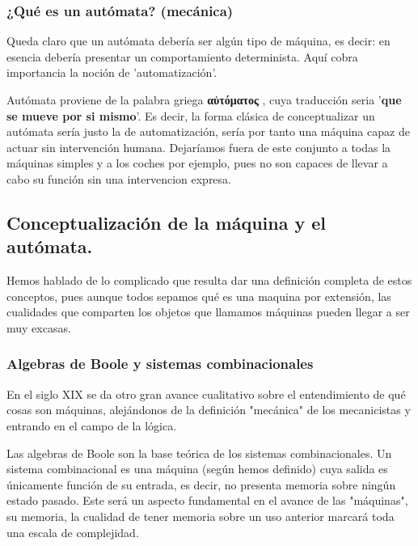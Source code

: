 \subsubsection{ ¿Qué es un autómata? (mecánica)}

Queda claro que un autómata debería ser algún tipo de máquina, es decir: en esencia debería presentar un comportamiento determinista. Aquí cobra importancia la noción de 'automatización'.

\vspace{10px}

Autómata proviene de la palabra griega \textbf{\textgreek{αὐτόματος}} , cuya traducción seria '\textbf{que se mueve por si mismo}'. Es decir, la forma clásica de conceptualizar un autómata sería justo la de automatización, sería por tanto una máquina capaz de actuar sin intervención humana. Dejaríamos fuera de este conjunto a todas la máquinas simples y a los coches por ejemplo, pues no son capaces de llevar a cabo su función sin una intervencion expresa.




\subsection{ Conceptualización de la máquina y el autómata.}

Hemos hablado de lo complicado que resulta dar una definición completa de estos conceptos, pues aunque todos sepamos qué es una maquina por extensión, las cualidades que comparten los objetos que llamamos máquinas pueden llegar a ser muy excasas.

\subsubsection{ Algebras de Boole y sistemas combinacionales}

En el siglo XIX se da otro gran avance cualitativo sobre el entendimiento de qué cosas son máquinas, alejándonos de la definición "mecánica" de los mecanicistas y entrando en el campo de la lógica.

\vspace{10px}

Las algebras de Boole son la base teórica de los sistemas combinacionales. Un sistema combinacional es una máquina (según hemos definido) cuya salida es únicamente función de su entrada, es decir, no presenta memoria sobre ningún estado pasado. Este será un aspecto fundamental en el avance de las "máquinas", su memoria, la cualidad de tener memoria sobre un uso anterior marcará toda una escala de complejidad.

